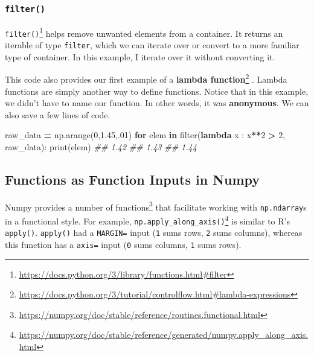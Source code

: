 \documentclass[
  12pt,
  krantz2]{krantz}
\makeatletter
\newenvironment{Shaded}{\begin{snugshade}}{\end{snugshade}}
\newcommand{\BuiltInTok}[1]{#1}
\newcommand{\CommentTok}[1]{\textcolor[rgb]{0.37,0.37,0.37}{\textit{#1}}}
\newcommand{\ControlFlowTok}[1]{\textcolor[rgb]{0.27,0.27,0.27}{\textbf{#1}}}
\newcommand{\DecValTok}[1]{\textcolor[rgb]{0.06,0.06,0.06}{#1}}
\newcommand{\FloatTok}[1]{\textcolor[rgb]{0.06,0.06,0.06}{#1}}
\newcommand{\KeywordTok}[1]{\textcolor[rgb]{0.27,0.27,0.27}{\textbf{#1}}}
\newcommand{\NormalTok}[1]{#1}
\newcommand{\OperatorTok}[1]{\textcolor[rgb]{0.43,0.43,0.43}{\textbf{#1}}}
\renewcommand{\href}[2]{#2\footnote{\url{#1}}}
\newenvironment{kframe}{%
\medskip{}
\setlength{\fboxsep}{.8em}
 \def\at@end@of@kframe{}%
 \ifinner\ifhmode%
  \def\at@end@of@kframe{\end{minipage}}%
  \begin{minipage}{\columnwidth}%
 \fi\fi%
 \def\FrameCommand##1{\hskip\@totalleftmargin \hskip-\fboxsep
 \colorbox{shadecolor}{##1}\hskip-\fboxsep
     \hskip-\linewidth \hskip-\@totalleftmargin \hskip\columnwidth}%
 \MakeFramed {\advance\hsize-\width
   \@totalleftmargin\z@ \linewidth\hsize
   \@setminipage}}%
 {\par\unskip\endMakeFramed%
 \at@end@of@kframe}
\renewenvironment{Shaded}{\begin{kframe}}{\end{kframe}}
\makeatother
\begin{document}
\hypertarget{filter}{%
\subsubsection{\texorpdfstring{\texttt{filter()}}{filter()}}\label{filter}}

\href{https://docs.python.org/3/library/functions.html\#filter}{\texttt{filter()}} helps remove unwanted elements from a container. It returns an iterable of type \texttt{filter}, which we can iterate over or convert to a more familiar type of container. In this example, I iterate over it without converting it.

This code also provides our first example of a \href{https://docs.python.org/3/tutorial/controlflow.html\#lambda-expressions}{\textbf{lambda function}} \citep{Lutz13}. Lambda functions are simply another way to define functions. Notice that in this example, we didn't have to name our function. In other words, it was \textbf{anonymous}. We can also save a few lines of code.

\begin{Shaded}
\begin{Highlighting}[]
\NormalTok{raw\_data }\OperatorTok{=}\NormalTok{ np.arange(}\DecValTok{0}\NormalTok{,}\FloatTok{1.45}\NormalTok{,}\FloatTok{.01}\NormalTok{)}
\ControlFlowTok{for}\NormalTok{ elem }\KeywordTok{in} \BuiltInTok{filter}\NormalTok{(}\KeywordTok{lambda}\NormalTok{ x : x}\OperatorTok{**}\DecValTok{2} \OperatorTok{\textgreater{}} \DecValTok{2}\NormalTok{, raw\_data):}
    \BuiltInTok{print}\NormalTok{(elem)}
\CommentTok{\#\# 1.42}
\CommentTok{\#\# 1.43}
\CommentTok{\#\# 1.44}
\end{Highlighting}
\end{Shaded}

\hypertarget{functions-as-function-inputs-in-numpy}{%
\subsection{Functions as Function Inputs in Numpy}\label{functions-as-function-inputs-in-numpy}}

Numpy provides a \href{https://numpy.org/doc/stable/reference/routines.functional.html}{number of functions} that facilitate working with \texttt{np.ndarray}s in a functional style. For example, \href{https://numpy.org/doc/stable/reference/generated/numpy.apply_along_axis.html}{\texttt{np.apply\_along\_axis()}} is similar to R's \texttt{apply()}. \texttt{apply()} had a \texttt{MARGIN=} input (\texttt{1} sums rows, \texttt{2} sums columns), whereas this function has a \texttt{axis=} input (\texttt{0} sums columns, \texttt{1} sums rows).
\end{document}
